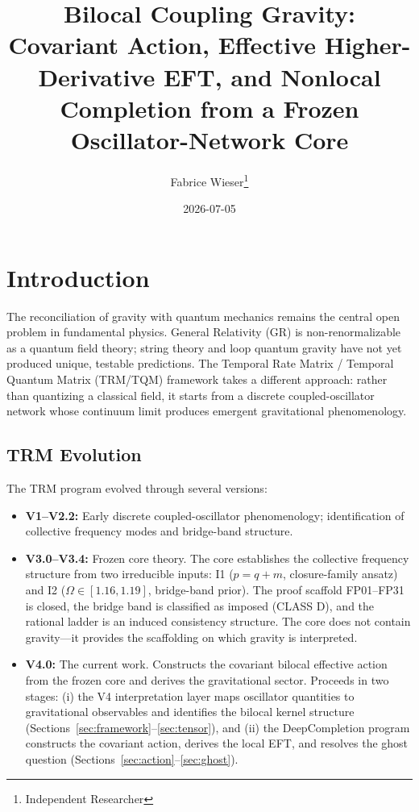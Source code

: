 \documentclass[12pt]{article}
\title{Bilocal Coupling Gravity: Covariant Action, Effective Higher-Derivative EFT, and Nonlocal Completion from a Frozen Oscillator-Network Core}
\author{Fabrice Wieser\thanks{Independent Researcher}}
\date{2026-07-05}
\begin{document}
\maketitle

\tableofcontents

\section{Introduction}

The reconciliation of gravity with quantum mechanics remains the central open problem in fundamental physics. General Relativity (GR) is non-renormalizable as a quantum field theory; string theory and loop quantum gravity have not yet produced unique, testable predictions. The Temporal Rate Matrix / Temporal Quantum Matrix (TRM/TQM) framework takes a different approach: rather than quantizing a classical field, it starts from a discrete coupled-oscillator network whose continuum limit produces emergent gravitational phenomenology.

\subsection{TRM Evolution}

The TRM program evolved through several versions:
\begin{itemize}
\item \textbf{V1--V2.2:} Early discrete coupled-oscillator phenomenology; identification of collective frequency modes and bridge-band structure.
\item \textbf{V3.0--V3.4:} Frozen core theory. The core establishes the collective frequency structure from two irreducible inputs: I1 ($p = q + m$, closure-family ansatz) and I2 ($\Omega \in [1.16, 1.19]$, bridge-band prior). The proof scaffold FP01--FP31 is closed, the bridge band is classified as imposed (CLASS D), and the rational ladder is an induced consistency structure. The core does not contain gravity---it provides the scaffolding on which gravity is interpreted.
\item \textbf{V4.0:} The current work. Constructs the covariant bilocal effective action from the frozen core and derives the gravitational sector. Proceeds in two stages: (i) the V4 interpretation layer maps oscillator quantities to gravitational observables and identifies the bilocal kernel structure (Sections~\ref{sec:framework}--\ref{sec:tensor}), and (ii) the DeepCompletion program constructs the covariant action, derives the local EFT, and resolves the ghost question (Sections~\ref{sec:action}--\ref{sec:ghost}).
\end{itemize}
\end{document}
